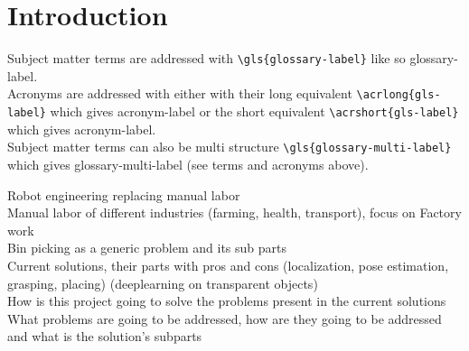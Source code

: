 \chapter{Introduction} \label{ch:intro}

Subject matter terms are addressed with \texttt{\textbackslash gls\{glossary-label\}} like so \gls{glossary-label}. \\
Acronyms are addressed with either with their long equivalent \texttt{\textbackslash acrlong\{gls-label\}} which gives \acrlong{acronym-label}
or the short equivalent \texttt{\textbackslash acrshort\{gls-label\}} which gives \acrshort{acronym-label}. \\
Subject matter terms can also be multi structure \texttt{\textbackslash gls\{glossary-multi-label\}} which gives \gls{glossary-multi-label}
(see terms and acronyms above). \medskip



Robot engineering replacing manual labor\\
Manual labor of different industries (farming, health, transport), focus on Factory work \\
Bin picking as a generic problem and its sub parts \\
Current solutions, their parts with pros and cons (localization, pose estimation, grasping, placing) (deeplearning on transparent objects) \\
How is this project going to solve the problems present in the current solutions \\
What problems are going to be addressed, how are they going to be addressed and what is the solution's subparts \\
